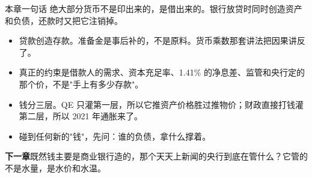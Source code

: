 \begin{takeaway}{本章一句话}
绝大部分货币不是印出来的，是借出来的。银行放贷时同时创造资产和负债，还款时又把它注销掉。

\begin{itemize}
  \item 贷款创造存款。准备金是事后补的，不是原料。货币乘数那套讲法把因果讲反了。
  \item 真正的约束是借款人的需求、资本充足率、1.41\% 的净息差、监管和央行定的那个价，不是"手上有多少存款"。
  \item 钱分三层。QE 只灌第一层，所以它推资产价格胜过推物价；财政直接打钱灌第二层，所以 2021 年通胀来了。
  \item 碰到任何新的"钱"，先问：谁的负债，拿什么撑着。
\end{itemize}

\end{takeaway}

\begin{bridgebox}
\textbf{下一章}既然钱主要是商业银行造的，那个天天上新闻的央行到底在管什么？它管的不是水量，是水价和水温。
\end{bridgebox}

